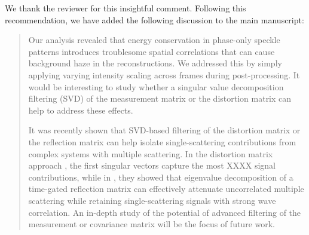 \documentclass[12pt]{article}
\newcommand{\hlred}[1]{\sethlcolor{red!30}\hl{#1}}
\newenvironment{ourresponse}
    {\begin{tcolorbox}[width=\linewidth,breakable,enhanced,colback=gray!5,colframe=responsecolor!50,title=Response,left=5pt,right=5pt]}
    {\end{tcolorbox}}
\begin{document}
\begin{enumerate}[label=\arabic*.]
\begin{ourresponse}

    

    We thank the reviewer for this insightful comment. Following this recommendation, we have added the following discussion to the main manuscript:
    
    \begin{quote}
        Our analysis revealed that energy conservation in phase-only speckle patterns introduces troublesome spatial correlations that can cause background haze in the reconstructions. We addressed this by simply applying varying intensity scaling across frames during post-processing. It would be interesting to study whether a singular value decomposition filtering (SVD) of the measurement matrix or the distortion matrix \cite{badon2020distortion,jo2022through} can help to address these effects.
        

        It was recently shown that SVD-based filtering of the distortion matrix \cite{badon2020distortion} or the reflection matrix \cite{jo2022through} can help isolate single-scattering contributions from complex systems with multiple scattering. In the distortion matrix approach \cite{badon2020distortion}, the first singular vectors capture the most XXXX signal contributions, while in \cite{jo2022through}, they showed that eigenvalue decomposition of a time-gated reflection matrix can effectively attenuate uncorrelated multiple scattering while retaining single-scattering signals with strong wave correlation. An in-depth study of the potential of advanced filtering of the measurement or covariance matrix will be the focus of future work.


\end{quote}
\end{ourresponse}
\end{enumerate}
\end{document}
